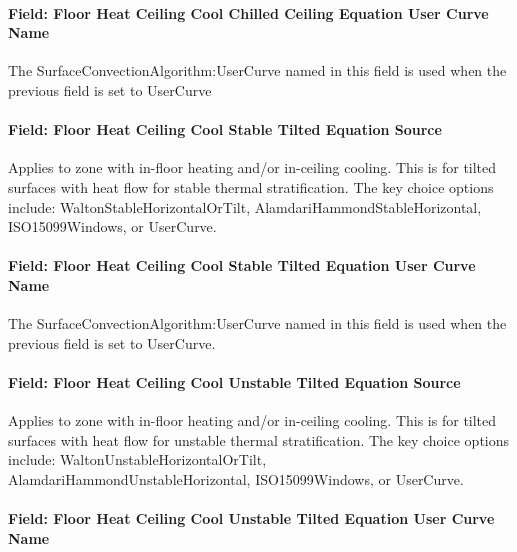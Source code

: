 \paragraph{Field: Floor Heat Ceiling Cool Chilled Ceiling Equation User Curve Name}\label{field-floor-heat-ceiling-cool-chilled-ceiling-equation-user-curve-name}

The SurfaceConvectionAlgorithm:UserCurve named in this field is used when the previous field is set to UserCurve

\paragraph{Field: Floor Heat Ceiling Cool Stable Tilted Equation Source}\label{field-floor-heat-ceiling-cool-stable-tilted-equation-source}

Applies to zone with in-floor heating and/or in-ceiling cooling. This is for tilted surfaces with heat flow for stable thermal stratification. The key choice options include: WaltonStableHorizontalOrTilt, AlamdariHammondStableHorizontal, ISO15099Windows, or UserCurve.

\paragraph{Field: Floor Heat Ceiling Cool Stable Tilted Equation User Curve Name}\label{field-floor-heat-ceiling-cool-stable-tilted-equation-user-curve-name}

The SurfaceConvectionAlgorithm:UserCurve named in this field is used when the previous field is set to UserCurve.

\paragraph{Field: Floor Heat Ceiling Cool Unstable Tilted Equation Source}\label{field-floor-heat-ceiling-cool-unstable-tilted-equation-source}

Applies to zone with in-floor heating and/or in-ceiling cooling. This is for tilted surfaces with heat flow for unstable thermal stratification. The key choice options include: WaltonUnstableHorizontalOrTilt, AlamdariHammondUnstableHorizontal, ISO15099Windows, or UserCurve.

\paragraph{Field: Floor Heat Ceiling Cool Unstable Tilted Equation User Curve Name}\label{field-floor-heat-ceiling-cool-unstable-tilted-equation-user-curve-name}

